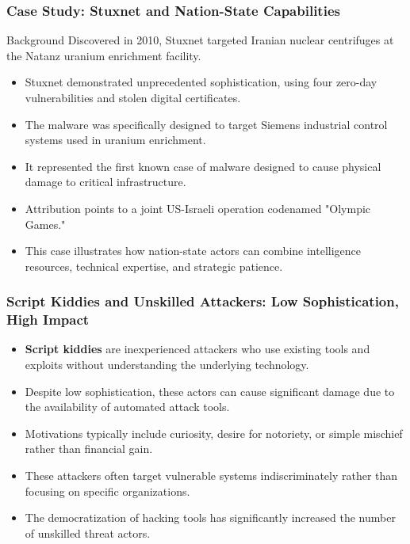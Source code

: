 \documentclass{beamer}
\begin{document}
\begin{frame}
    \frametitle{Case Study: Stuxnet and Nation-State Capabilities}
    
    \begin{block}{Background}
        Discovered in 2010, Stuxnet targeted Iranian nuclear centrifuges at the Natanz uranium enrichment facility.
    \end{block}
    
    \begin{itemize}
        \item Stuxnet demonstrated unprecedented sophistication, using four zero-day vulnerabilities and stolen digital certificates.
        \item The malware was specifically designed to target Siemens industrial control systems used in uranium enrichment.
        \item It represented the first known case of malware designed to cause physical damage to critical infrastructure.
        \item Attribution points to a joint US-Israeli operation codenamed "Olympic Games."
        \item This case illustrates how nation-state actors can combine intelligence resources, technical expertise, and strategic patience.
    \end{itemize}
\end{frame}

\begin{frame}
    \frametitle{Script Kiddies and Unskilled Attackers: Low Sophistication, High Impact}
    
    \begin{itemize}
        \item \textbf{Script kiddies} are inexperienced attackers who use existing tools and exploits without understanding the underlying technology.
        \item Despite low sophistication, these actors can cause significant damage due to the availability of automated attack tools.
        \item Motivations typically include curiosity, desire for notoriety, or simple mischief rather than financial gain.
        \item These attackers often target vulnerable systems indiscriminately rather than focusing on specific organizations.
        \item The democratization of hacking tools has significantly increased the number of unskilled threat actors.
    \end{itemize}
\end{frame}
\end{document}
